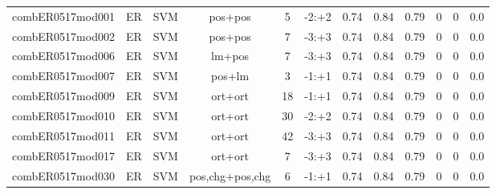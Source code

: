 \documentclass[a4paper]{article}
\begin{document}
\begin{landscape}
\begin{center}
\begin{tabular}{ |c|c|c|c|c|c|c|c|c|c|c|c|}
 	
 
 	
 		
 		\small{ combER0517mod001 } & ER & SVM & pos+pos  &  5 &  -2:+2  &  0.74 & 0.84 & 0.79  &  0 & 0 & 0.0 \\
 		

 	
 
 	
 		
 		\small{ combER0517mod002 } & ER & SVM & pos+pos  &  7 &  -3:+3  &  0.74 & 0.84 & 0.79  &  0 & 0 & 0.0 \\
 		

 	
 
 	
 		
 		\small{ combER0517mod006 } & ER & SVM & lm+pos  &  7 &  -3:+3  &  0.74 & 0.84 & 0.79  &  0 & 0 & 0.0 \\
 		

 	
 
 	
 		
 		\small{ combER0517mod007 } & ER & SVM & pos+lm  &  3 &  -1:+1  &  0.74 & 0.84 & 0.79  &  0 & 0 & 0.0 \\
 		

 	
 
 	
 		
 		\small{ combER0517mod009 } & ER & SVM & ort+ort  &  18 &  -1:+1  &  0.74 & 0.84 & 0.79  &  0 & 0 & 0.0 \\
 		

 	
 
 	
 		
 		\small{ combER0517mod010 } & ER & SVM & ort+ort  &  30 &  -2:+2  &  0.74 & 0.84 & 0.79  &  0 & 0 & 0.0 \\
 		

 	
 
 	
 		
 		\small{ combER0517mod011 } & ER & SVM & ort+ort  &  42 &  -3:+3  &  0.74 & 0.84 & 0.79  &  0 & 0 & 0.0 \\
 		

 	
 
 	
 		
 		\small{ combER0517mod017 } & ER & SVM & ort+ort  &  7 &  -3:+3  &  0.74 & 0.84 & 0.79  &  0 & 0 & 0.0 \\
 		

 	
 
 	
 		
 		\small{ combER0517mod030 } & ER & SVM & pos,chg+pos,chg  &  6 &  -1:+1  &  0.74 & 0.84 & 0.79  &  0 & 0 & 0.0 \\
 		

 	
 

\end{tabular}
\end{center}
\end{landscape}
\end{document}
